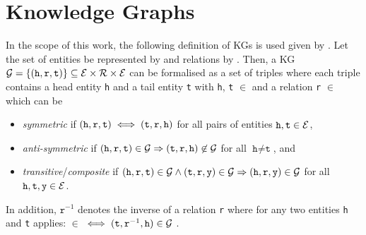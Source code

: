 \section{Knowledge Graphs} 
\label{sec:knowledge_graphs}
%
In the scope of this work, the following definition of \acp{KG} is used given by \cite{ConEx, RotatE}.
Let the set of entities be represented by \entities and relations by \relations.
Then, a \ac{KG} $\mathcal{G}= \{(\texttt{h}, \texttt{r}, \texttt{t}) \}  \subseteq \mathcal{E} \times \mathcal{R} \times \mathcal{E}$ can be formalised as a set of triples where each triple contains a head entity \texttt{h} and a tail entity \texttt{t} with \texttt{h}, \texttt{t} $\in$ \entities and a relation \texttt{r} $\in$ \relations which can be \cite{ConEx}
\begin{itemize}
    \item 
    \emph{symmetric} if $(\texttt{h}, \texttt{r}, \texttt{t}) \iff (\texttt{t}, \texttt{r}, \texttt{h})$ for all pairs of entities $\texttt{h},\texttt{t}\in \mathcal{E}$, 
   
   \item 
   \emph{anti-symmetric} if $(\texttt{h}, \texttt{r}, \texttt{t}) \in \mathcal{G} \Rightarrow (\texttt{t}, \texttt{r}, \texttt{h}) \not \in \mathcal{G}$ for all $\texttt{h} \not= \texttt{t}$, and
    
    \item 
    \emph{transitive}/\emph{composite} if $(\texttt{h}, \texttt{r}, \texttt{t})\in\mathcal{G} \wedge (\texttt{t}, \texttt{r}, \texttt{y}) \in \mathcal{G}  \Rightarrow (\texttt{h}, \texttt{r}, \texttt{y}) \in \mathcal{G}$ for all $\texttt{h},\texttt{t},\texttt{y}\in \mathcal{E}$.
\end{itemize}
In addition, $\texttt{r}^{-1}$ denotes the inverse of a relation \texttt{r} where for any two entities \texttt{h} and \texttt{t} applies: 
 $\in$ \kg $\iff (\texttt{t},\texttt{r}^{-1},\texttt{h}) \in \mathcal{G}$ \cite{ConEx}.